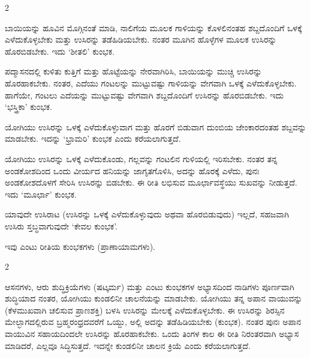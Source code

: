 \begin{multicols}{2}
\begin{kan}

ಬಾಯಿಯನ್ನು ಹೂವಿನ ಮೊಗ್ಗಿನಂತೆ ಮಾಡಿ, ನಾಲಿಗೆಯ ಮೂಲಕ ಗಾಳಿಯನ್ನು ಕೊಳಲಿನಂತಹ ಶಬ್ದದೊಂದಿಗೆ ಒಳಕ್ಕೆ ಎಳೆದುಕೊಳ್ಳಬೇಕು ಮತ್ತು ಉಸಿರನ್ನು ತಡೆಹಿಡಿಯಬೇಕು. ನಂತರ ಮೂಗಿನ ಹೊಳ್ಳೆಗಳ ಮೂಲಕ ಉಸಿರನ್ನು ಹೊರಬಿಡಬೇಕು. ಇದು ‘ಶೀತಲಿ’ ಕುಂಭಕ.
\vskip 7pt


ಪದ್ಮಾಸನದಲ್ಲಿ ಕುಳಿತು ಕುತ್ತಿಗೆ ಮತ್ತು ಹೊಟ್ಟೆಯನ್ನು ನೇರವಾಗಿರಿಸಿ, ಬಾಯಿಯನ್ನು ಮುಚ್ಚಿ ಉಸಿರನ್ನು ಹೊರಹಾಕಬೇಕು. ನಂತರ, ಎದೆಯು ಗಂಟಲನ್ನು ಮುಟ್ಟುವಷ್ಟು ಗಾಳಿಯನ್ನು ವೇಗವಾಗಿ ಒಳಕ್ಕೆ ಎಳೆದುಕೊಳ್ಳಬೇಕು. ಹಾಗೆಯೇ, ಗಂಟಲು ಎದೆಯನ್ನು ಮುಟ್ಟುವಷ್ಟು ವೇಗವಾಗಿ ಶಬ್ದದೊಂದಿಗೆ ಉಸಿರನ್ನು ಹೊರಬಿಡಬೇಕು. ಇದು ‘ಭಸ್ತ್ರಿಕಾ’ ಕುಂಭಕ.
\vskip 7pt


ಯೋಗಿಯು ಉಸಿರನ್ನು ಒಳಕ್ಕೆ ಎಳೆದುಕೊಳ್ಳುವಾಗ ಮತ್ತು ಹೊರಗೆ ಬಿಡುವಾಗ ದುಂಬಿಯ ಜೇಂಕಾರದಂತಹ ಶಬ್ದವನ್ನು ಮಾಡಬೇಕು. ಇದನ್ನು ‘ಭ್ರಾಮರಿ’ ಕುಂಭಕ ಎಂದು ಕರೆಯಲಾಗುತ್ತದೆ.
\columnbreak


ಯೋಗಿಯು ಉಸಿರನ್ನು ಒಳಕ್ಕೆ ಎಳೆದುಕೊಂಡು, ಗಲ್ಲವನ್ನು ಗಂಟಲಿನ ಗುಳಿಯಲ್ಲಿ ಇರಿಸಬೇಕು. ನಂತರ ತನ್ನ ಅಂಡಕೋಶದಿಂದ ಒಂದು ವೀರ್ಯದ ಹನಿಯನ್ನು ಜಾಗೃತಗೊಳಿಸಿ, ಅದನ್ನು ಹೊರಕ್ಕೆ ಎಳೆದು, ಪುನಃ ಅಂಡಕೋಶದೊಳಗೆ ಸೇರಿಸಿ ಉಸಿರನ್ನು ಬಿಡಬೇಕು. ಈ ರೀತಿ ಲಭಿಸುವ ಮೂರ್ಛಾವಸ್ಥೆಯು ಸುಖವನ್ನು ನೀಡುತ್ತದೆ. ಇದು ‘ಮೂರ್ಛಾ’ ಕುಂಭಕ.
\vskip 7pt


ಯಾವುದೇ ಉಸಿರಾಟ (ಉಸಿರನ್ನು ಒಳಕ್ಕೆ ಎಳೆದುಕೊಳ್ಳುವುದು ಅಥವಾ ಹೊರಬಿಡುವುದು) ಇಲ್ಲದೆ, ಸಹಜವಾಗಿ ಉಸಿರು ಸ್ತಬ್ಧವಾಗುವುದೇ ‘ಕೇವಲ ಕುಂಭಕ’.

ಇವು ಎಂಟು ರೀತಿಯ ಕುಂಭಕಗಳು (ಪ್ರಾಣಾಯಾಮಗಳು).
\end{kan}
\end{multicols}
\vskip 7pt


\begin{kan}
\end{kan}
\vskip 7pt

\begin{multicols}{2}
\begin{kan}

ಆಸನಗಳು, ಆರು ಶುದ್ಧಿಕ್ರಿಯೆಗಳು (ಷಟ್ಕರ್ಮ) ಮತ್ತು ಎಂಟು ಕುಂಭಕಗಳ ಅಭ್ಯಾಸದಿಂದ ನಾಡಿಗಳು ಪೂರ್ಣವಾಗಿ ಶುದ್ಧಿಯಾದ ನಂತರ, ಯೋಗಿಯು ಕುಂಡಲಿನೀ ಚಾಲನೆಯನ್ನು ಮಾಡಬೇಕು. ಯೋಗಿಯು ತನ್ನ ಅಪಾನ ವಾಯುವನ್ನು (ಕೆಳಮುಖವಾಗಿ ಚಲಿಸುವ ಪ್ರಾಣಶಕ್ತಿ) ಬಳಸಿ ಉಸಿರನ್ನು ಮೇಲಕ್ಕೆ ಎಳೆದುಕೊಳ್ಳಬೇಕು. ಈ ಉಸಿರನ್ನು ಶಿರಸ್ಸಿನ ಮೇಲ್ಭಾಗದಲ್ಲಿರುವ ಬ್ರಹ್ಮರಂಧ್ರದವರೆಗೆ ಒಯ್ದು, ಅಲ್ಲಿ ಅದನ್ನು ತಡೆಹಿಡಿಯಬೇಕು (ಕುಂಭಕ). ನಂತರ ಪುನಃ ಅಪಾನ ವಾಯುವಿನ ಸಹಾಯದಿಂದಲೇ ಉಸಿರನ್ನು ಹೊರಹಾಕಬೇಕು. ಒಂದು ತಿಂಗಳ ಕಾಲ ಈ ರೀತಿ ನಿರಂತರವಾಗಿ ಅಭ್ಯಾಸ ಮಾಡಿದರೆ, ಎಲ್ಲವೂ ಸಿದ್ಧಿಸುತ್ತದೆ. ಇದನ್ನೇ ಕುಂಡಲಿನೀ ಚಾಲನ ಕ್ರಿಯೆ ಎಂದು ಕರೆಯಲಾಗುತ್ತದೆ.
\end{kan}
\end{multicols}

